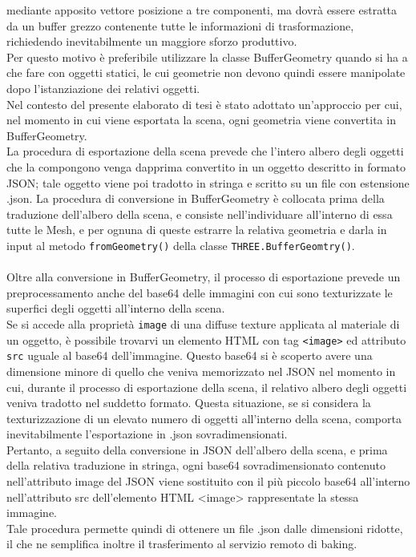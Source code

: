 mediante apposito vettore posizione a tre componenti, ma dovrà essere estratta da un buffer grezzo contenente tutte le informazioni di trasformazione, richiedendo inevitabilmente un maggiore sforzo produttivo.
\\
Per questo motivo è preferibile utilizzare la classe BufferGeometry quando si ha a che fare con oggetti statici, le cui geometrie non devono quindi essere manipolate dopo l’istanziazione dei relativi oggetti.
\\
Nel contesto del presente elaborato di tesi è stato adottato un’approccio per cui, nel momento in cui viene esportata la scena, ogni geometria viene convertita in BufferGeometry.    
\\
La procedura di esportazione della scena prevede che l’intero albero degli oggetti che la compongono venga dapprima convertito in un oggetto descritto in formato JSON; tale oggetto viene poi tradotto in stringa e scritto su un file con estensione .json. La procedura di conversione in BufferGeometry è collocata prima della traduzione dell’albero della scena, e consiste nell’individuare all’interno di essa tutte le Mesh, e per ognuna di queste estrarre la relativa geometria e darla in input al metodo \texttt{fromGeometry()} della classe \texttt{THREE.BufferGeomtry()}. 
\\
\\
Oltre alla conversione in BufferGeometry, il processo di esportazione prevede un preprocessamento anche del base64 delle immagini con cui sono texturizzate le superfici degli oggetti all’interno della scena. 
\\
Se si accede alla proprietà \texttt{image} di una diffuse texture applicata al materiale di un oggetto, è possibile trovarvi un elemento HTML con tag \texttt{<image>} ed attributo \texttt{src} uguale al base64 dell’immagine. Questo base64 si è scoperto avere una dimensione minore di quello che veniva memorizzato nel JSON nel momento in cui, durante il processo di esportazione della scena, il relativo albero degli oggetti veniva tradotto nel suddetto formato. Questa situazione, se si considera la texturizzazione di un elevato numero di oggetti all’interno della scena, comporta inevitabilmente l’esportazione in .json sovradimensionati. 
\\
Pertanto, a seguito della conversione in JSON dell’albero della scena, e prima della relativa traduzione in stringa, ogni base64 sovradimensionato contenuto nell’attributo image del JSON viene sostituito con il più piccolo base64 all’interno nell’attributo src dell’elemento HTML <image> rappresentate la stessa immagine.
\\
Tale procedura permette quindi di ottenere un file .json dalle dimensioni ridotte, il che ne semplifica inoltre il trasferimento al servizio remoto di baking. 

